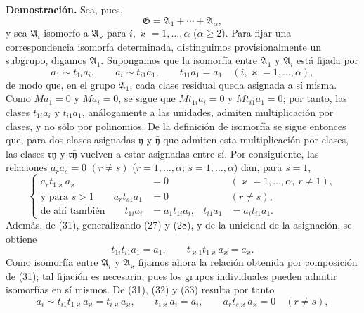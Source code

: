 \textbf{Demostración.} Sea, pues,
\[
  \mathfrak G=\mathfrak A_1+\cdots+\mathfrak A_\alpha,
\]
y sea $\mathfrak A_i$ isomorfo a $\mathfrak A_\varkappa$ para $i,\varkappa=1,\ldots,\alpha$ ($\alpha\ge2$). Para fijar una correspondencia isomorfa determinada, distinguimos provisionalmente un subgrupo, digamos $\mathfrak A_1$. Supongamos que la isomorfía entre $\mathfrak A_1$ y $\mathfrak A_i$ está fijada por
\begin{equation}
 a_1\sim t_{1i}a_i,
 \qquad
 a_i\sim t_{i1}a_1,
 \qquad
 t_{11}a_1=a_1
 \quad(i,\varkappa=1,
\ldots,\alpha),
\tag{31}
\end{equation}
de modo que, en el grupo $\mathfrak A_1$, cada clase residual queda asignada a sí misma. Como $Ma_1=0$ y $Ma_i=0$, se sigue que $Mt_{1i}a_i=0$ y $Mt_{i1}a_1=0$; por tanto, las clases $t_{1i}a_i$ y $t_{i1}a_1$, análogamente a las unidades, admiten multiplicación por clases, y no sólo por polinomios. De la definición de isomorfía se sigue entonces que, para dos clases asignadas $\mathfrak y$ y $\bar{\mathfrak y}$ que admiten esta multiplicación por clases, las clases $\mathfrak r\mathfrak y$ y $\mathfrak r\bar{\mathfrak y}$ vuelven a estar asignadas entre sí. Por consiguiente, las relaciones $a_ra_s=0$ $(r\ne s)$ ($r=1,\ldots,\alpha$; $s=1,\ldots,\alpha$) dan, para $s=1$,
\begin{equation}
\left\{
\begin{aligned}
 a_r t_{1\varkappa}a_\varkappa&=0 &&(\varkappa=1,
\ldots,
\alpha,
\ r\ne1),\\
 \text{y para }s>1\qquad a_r t_{s1}a_1&=0 &&(r\ne s),\\
 \text{de ahí también}\qquad t_{1i}a_i&=a_1t_{1i}a_i,
 &t_{i1}a_1&=a_it_{i1}a_1.
\end{aligned}\right.
\tag{32}
\end{equation}
Además, de (31), generalizando (27) y (28), y de la unicidad de la asignación, se obtiene
\begin{equation}
 t_{1i}t_{i1}a_1=a_1,
 \qquad
 t_{\varkappa1}t_{1\varkappa}a_\varkappa=a_\varkappa.
\tag{33}
\end{equation}
Como isomorfía entre $\mathfrak A_i$ y $\mathfrak A_\varkappa$ fijamos ahora la relación obtenida por composición de (31); tal fijación es necesaria, pues los grupos individuales pueden admitir isomorfías en sí mismos. De (31), (32) y (33) resulta por tanto
\begin{equation}
 a_i\sim t_{i1}t_{1\varkappa}a_\varkappa=t_{i\varkappa}a_\varkappa,
 \qquad
 t_{i\varkappa}a_i=a_i,
 \qquad
 a_rt_{s\varkappa}a_\varkappa=0\quad(r\ne s),
\tag{34}
\end{equation}
